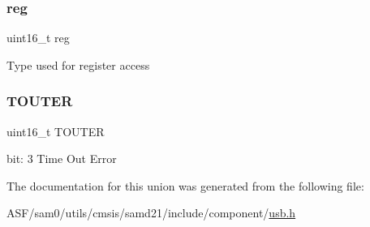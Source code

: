 \subsubsection{\texorpdfstring{reg}{reg}}
{\footnotesize\ttfamily uint16\+\_\+t reg}

Type used for register access \mbox{\label{union_u_s_b___h_o_s_t___s_t_a_t_u_s___p_i_p_e___type_ac6bc715c3257704f9aef2f693c8868b4}} 
\subsubsection{\texorpdfstring{TOUTER}{TOUTER}}
{\footnotesize\ttfamily uint16\+\_\+t T\+O\+U\+T\+ER}

bit\+: 3 Time Out Error 

The documentation for this union was generated from the following file\+:\begin{DoxyCompactItemize}
\item 
A\+S\+F/sam0/utils/cmsis/samd21/include/component/\mbox{\hyperlink{component_2usb_8h}{usb.\+h}}\end{DoxyCompactItemize}
